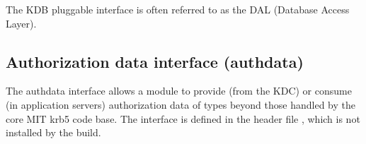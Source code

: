 \documentclass[letterpaper,10pt,english]{sphinxmanual}
\begin{document}
The KDB pluggable interface is often referred to as the DAL (Database
Access Layer).


\subsection{Authorization data interface (authdata)}
\label{plugindev/internal:authorization-data-interface-authdata}
The authdata interface allows a module to provide (from the KDC) or
consume (in application servers) authorization data of types beyond
those handled by the core MIT krb5 code base.  The interface is
defined in the header file , which is not
installed by the build.



\renewcommand{\indexname}{Index}
\printindex
\end{document}
